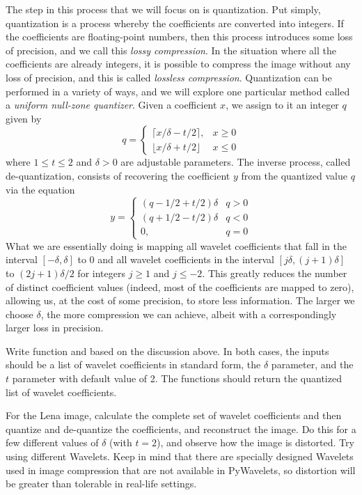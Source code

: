  The step in this process that we will focus on is quantization. Put simply,
 quantization is a process whereby the coefficients are converted into
 integers. If the coefficients are floating-point numbers, then this
 process introduces some loss of precision, and we call this \textit{
 lossy compression}. In the situation where all the coefficients are already
 integers, it is possible to compress the image without any loss of precision,
 and this is called \textit{lossless compression}. Quantization can be
 performed in a variety of ways, and we will explore one particular method
 called a \emph{uniform null-zone quantizer}. Given a coefficient $x$, we assign
 to it an integer $q$ given by
\begin{equation*}
q =
 \begin{cases}
   \lceil x / \delta - t/2 \rceil, &  x \geq 0\\
   \lfloor x / \delta + t/2 \rfloor & x \leq 0
 \end{cases}
\end{equation*}
where $1 \leq t \leq 2$ and $\delta > 0$ are adjustable parameters.
The inverse process, called de-quantization, consists of recovering
the coefficient $y$ from the quantized value $q$ via the equation
\begin{equation*}
 y =
  \begin{cases}
   (q - 1/2 + t/2)\delta & q > 0\\
   (q + 1/2 - t/2)\delta & q < 0\\
   0,                    & q = 0
  \end{cases}
 \end{equation*}
What we are essentially doing is mapping all wavelet coefficients that
fall in the interval $[-\delta,\delta]$ to 0 and all wavelet coefficients
in the interval $[j\delta,(j+1)\delta]$ to $(2j+1)\delta/2$ for integers
$j \geq 1$ and $j \leq -2$. This greatly reduces the number of distinct
coefficient values (indeed, most of the coefficients are mapped to
zero), allowing us, at the cost of some precision, to store less
information. The larger we choose $\delta$, the more compression we
can achieve, albeit with a correspondingly larger loss in precision.
\begin{problem}
Write function  and  based on the discussion above.
In both cases, the inputs should be a list of wavelet coefficients in
standard form, the $\delta$ parameter, and the $t$ parameter with default
value of 2. The functions should return the quantized list of wavelet
coefficients.

For the Lena image, calculate the complete set of wavelet coefficients and then
quantize and de-quantize the coefficients, and reconstruct the image.
Do this for a few different values of $\delta$ (with $t=2$), and observe how
the image is distorted. Try using different Wavelets. Keep in mind that there are
specially designed Wavelets used in image compression that are not available
in PyWavelets, so distortion will be greater than tolerable in real-life settings.
\end{problem}
